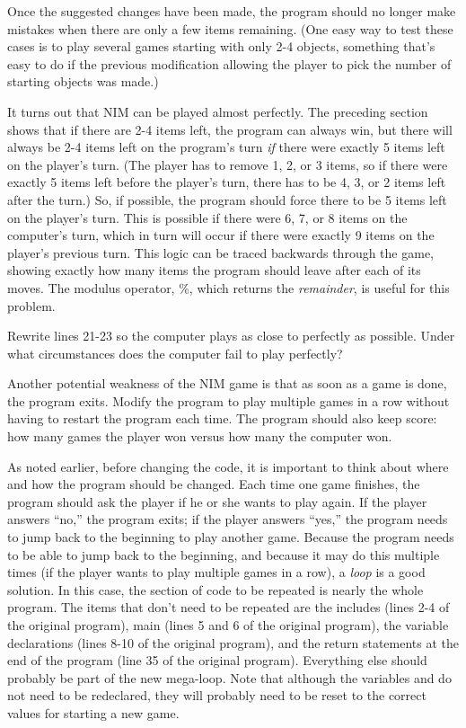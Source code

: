 Once the suggested changes have been made, the program should no longer make mistakes when there are only a few items remaining.  (One easy way to test these cases is to play several games starting with only 2-4 objects, something that's easy to do if the previous modification allowing the player to pick the number of starting objects was made.)  

It turns out that NIM can be played almost perfectly.  The preceding section shows that if there are 2-4 items left, the program can always win, but there will always be 2-4 items left on the program's turn \emph{if} there were exactly 5 items left on the player's turn.  (The player has to remove 1, 2, or 3 items, so if there were exactly 5 items left before the player's turn, there has to be 4, 3, or 2 items left after the turn.)  So, if possible, the program should force there to be 5 items left on the player's turn.  This is possible if there were 6, 7, or 8 items on the computer's turn, which in turn will occur if there were exactly 9 items on the player's previous turn.  This logic can be traced backwards through the game, showing exactly how many items the program should leave after each of its moves.  The modulus operator, \%, which returns the \emph{remainder}, is useful for this problem.

Rewrite lines 21-23 so the computer plays as close to perfectly as possible.  Under what circumstances does the computer fail to play perfectly?


Another potential weakness of the NIM game is that as soon as a game is done, the program exits.  Modify the program to play multiple games in a row without having to restart the program each time.    The program should also keep score: how many games the player won versus how many the computer won.  

As noted earlier, before changing the code, it is important to think about where and how the program should be changed.  Each time one game finishes, the program should ask the player if he or she wants to play again.  If the player answers ``no,'' the program exits; if the player answers ``yes,'' the program needs to jump back to the beginning to play another game.  Because the program needs to be able to jump back to the beginning, and because it may do this multiple times (if the player wants to play multiple games in a row), a \emph{loop} is a good solution.   In this case, the section of code to be repeated is nearly the whole program.  The items that don't need to be repeated are the includes (lines 2-4 of the original program), main (lines 5 and 6 of the original program), the variable declarations (lines 8-10 of the original program), and the return statements at the end of the program (line 35 of the original program).  Everything else should probably be part of the new mega-loop.  Note that although the variables  and  do not need to be redeclared, they will probably need to be reset to the correct values for starting a new game.


